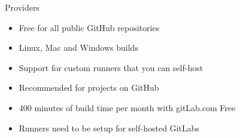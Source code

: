 \documentclass[
  aspectratio=1610,
]{beamer}
\begin{document}
\begin{frame}[c]{Providers}
  \begin{description}
    \item[GitHub Actions]
      \begin{itemize}
        \item Free for all public GitHub repositories
        \item Linux, Mac and Windows builds
        \item Support for custom runners that you can self-host
        \item Recommended for projects on GitHub
      \end{itemize}
    \item[GitLab CI]
      \begin{itemize}
        \item 400 minutes of build time per month with gitLab.com Free
        \item Runners need to be setup for self-hosted GitLabs
      \end{itemize}
  \end{description}
\end{frame}
\end{document}
